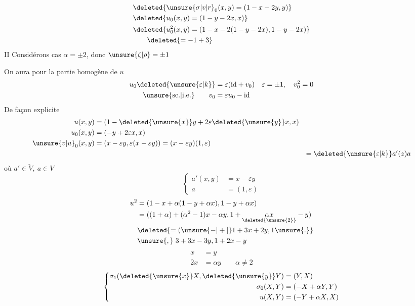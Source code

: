  
\[
\begin{aligned}
&\deleted{\unsure{\sigma|v|r}_0(x,y)=(1-x-2y,y)}\\
&\deleted{u_0(x,y)=(1-y-2x,x)}\\
&\deleted{u_0^2(x,y)=(1-x-2(1-y-2x),1-y-2x)}\\
&\qquad\deleted{=-1+3}
\end{aligned}
\]
II Considérons  cas $\alpha=\pm2$, donc $\unsure{\zeta|\rho}=\pm1$

On aura pour la partie homogène  de $u$
\[
\begin{aligned}
u_0\deleted{\unsure{\varepsilon|k}}&=\varepsilon(\mathrm{id}+v_0) &\varepsilon&=\pm1,\quad v_0^2=0\\
\text{\unsure{sc.|i.e.}}\qquad v_0&=\varepsilon u_0-\mathrm{id}
\end{aligned}
\]
De façon explicite
\[
\begin{aligned}
u(x,y)&=(1-\deleted{\unsure{x}}y+2\varepsilon\deleted{\unsure{y}}x,x)\\
u_0(x,y)&=(-y+2\varepsilon x,x)\\
\unsure{v|u}_0(x,y)&=(x-\varepsilon y,\varepsilon(x-\varepsilon y))=(x-\varepsilon y)(1,\varepsilon)\\
&&=\deleted{\unsure{\varepsilon|k}}a'(z)a
\end{aligned}
\]
où  $a'\in\check V,\ a\in V$
\[
\left\{\begin{aligned}
a'(x,y)&=x-\varepsilon y\\
a&=(1,\varepsilon)
\end{aligned}\right.
\]
\[
\begin{aligned}
u^2&=(1-x+\alpha(1-y+\alpha x),1-y+\alpha x)\\
&=((1+\alpha)+(\alpha^2-1)x-\alpha y,1+\underset{\deleted{\unsure{2}}}{\alpha x}-y)\\
&\deleted{=(\unsure{-|+|{}}1+3x+2y,1\unsure{.}}\\
&\unsure{,}\;3+3x-3y,1+2x-y
\end{aligned}
\]
\[
\begin{aligned} x&=y\\2x&=\alpha y\qquad\alpha\ne2\end{aligned}
\]
\[
\left\{\begin{aligned}
\sigma_1(\deleted{\unsure{x}}X,\deleted{\unsure{y}}Y)&=(Y,X)\\
\sigma_0(X,Y)&=(-X+\alpha Y,Y)\\
u(X,Y)&=(-Y+\alpha X,X)
\end{aligned}\right.
\]
